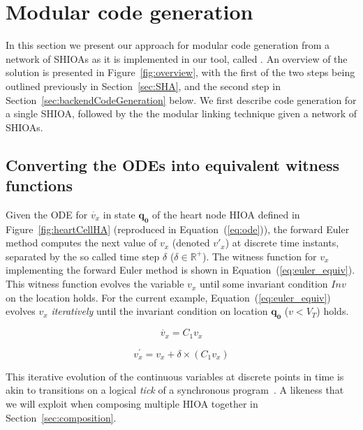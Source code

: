 \section{Modular code generation}
\label{sec:codeGen}

In this section we present our approach for modular code generation from
a network of \acp{SHIOA} as it is implemented in our tool, called
\ourTool. An overview of the solution is presented in
Figure~\ref{fig:overview}, with the first of the two steps being
outlined previously in Section~\ref{sec:SHA}, and the second step in
Section~\ref{sec:backendCodeGeneration} below. We first describe code
generation for a single \ac{SHIOA}, followed by the the modular linking
technique given a network of \acp{SHIOA}.

\subsection{Converting the \acp{ODE} into equivalent witness functions}
\label{sec:converting-odes-into}

Given the \ac{ODE} for $\dot{v_x}$ in state $\mathbf{q_0}$ of the heart
node \ac{HIOA} defined in Figure~\ref{fig:heartCellHA} (reproduced in
Equation~(\ref{eq:ode})), the forward Euler method computes the next
value of $v_{x}$ (denoted $v'_{x}$) at discrete time instants, separated
by the so called time step $\delta$
($\delta \in \mathbb{R}^{+}$). The witness function for $v_{x}$
implementing the forward Euler method is shown in
Equation~(\ref{eq:euler_equiv}). This witness function evolves the
variable $v_{x}$ until some invariant condition $Inv$ on the location
holds. For the current example, Equation~(\ref{eq:euler_equiv}) evolves
$v_{x}$ \emph{iteratively} until the invariant condition on location
$\mathbf{q_{0}}$ ($v < V_{T}$) holds.


\begin{equation}
  \dot{v_x} = C_{1} v_x
  \label{eq:ode}
\end{equation}

\begin{equation}
  v^\prime_x = v_x + \delta \times (C_{1} v_x)
  \label{eq:euler_equiv}
\end{equation}


This iterative evolution of the continuous variables at discrete points
in time is akin to transitions on a logical \emph{tick} of a
synchronous program~\cite{benveniste03}. A likeness that we will exploit when 
composing multiple \ac{HIOA} together in Section~\ref{sec:composition}.

